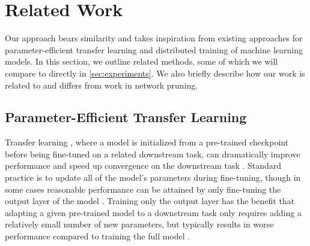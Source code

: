 \section{Related Work}
\label{sec:related}

Our approach bears similarity and takes inspiration from existing approaches for parameter-efficient transfer learning and distributed training of machine learning models. In this section, we outline related methods, some of which we will compare to directly in \ref{sec:experiments}. We also briefly describe how our work is related to and differs from work in network pruning. 

\subsection{Parameter-Efficient Transfer Learning}

Transfer learning \cite{pan2009survey}, where a model is initialized from a pre-trained checkpoint before being fine-tuned on a related downstream task, can dramatically improve performance and speed up convergence on the downstream task \citep{devlin-etal-2019-bert,DBLP:journals/corr/abs-2002-05709,raffel2020exploring}. Standard practice is to update all of the model's parameters during fine-tuning, though in some cases reasonable performance can be attained by only fine-tuning the output layer of the model \citep{DBLP:journals/corr/abs-1801-06146, DBLP:journals/corr/abs-2002-05709,peters2019tune}. Training only the output layer has the benefit that adapting a given pre-trained model to a downstream task only requires adding a relatively small number of new parameters, but typically results in worse performance compared to training the full model \cite{peters2019tune,kornblith2019better}.

